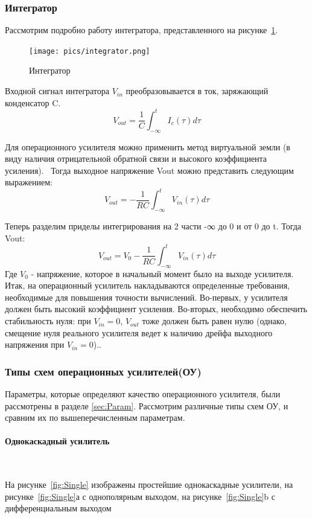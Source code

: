 \documentclass[a4paper,12pt,oneside]{scrartcl}
\begin{document}
\subsubsection{Интегратор}

Рассмотрим подробно работу интегратора, представленного на рисунке~\ref{fig:Integrator}.
\begin{figure}[!htb]
\centering
\texttt{[image: pics/integrator.png]}
\caption{Интегратор}
\label{fig:Integrator}
\end{figure}

Входной сигнал интегратора $V_{in}$ преобразовывается в ток, заряжающий конденсатор C.
$$V_{out} = \frac{1}{C}\int_{-\infty}^{t} I_{c}(\tau) d\tau$$

Для операционного усилителя можно применить метод виртуальной земли (в виду наличия отрицательной обратной связи и высокого коэффициента усиления).~\cite{B15} Тогда выходное напряжение Vout можно представить следующим выражением:
$$V_{out} = -\frac{1}{RC}\int_{-\infty}^{t} V_{in}(\tau) d\tau$$

Теперь разделим приделы интегрирования на 2 части -∞ до 0 и от 0 до t. Тогда Vout:
$$V_{out} = V_{0}-\frac{1}{RC}\int_{-\infty}^{t} V_{in}(\tau) d\tau$$
Где $V_{0}$ - напряжение, которое в начальный момент было на выходе усилителя.
Итак, на операционный усилитель накладываются определенные требования, необходимые для повышения точности вычислений. Во-первых, у усилителя должен быть высокий коэффициент усиления. Во-вторых, необходимо обеспечить стабильность нуля: при $V_{in} = 0$, $V_{out}$ тоже должен быть равен нулю (однако, смещение нуля реального усилителя ведет к наличию дрейфа выходного напряжения при $V_{in} = 0$)..~\cite{B9}

\subsubsection{Типы схем операционных усилителей(ОУ)}

Параметры, которые определяют качество операционного усилителя, были рассмотрены в разделе \ref{sec:Param}. Рассмотрим различные типы схем ОУ, и сравним их по вышеперечисленным параметрам. 




\paragraph{Однокаскадный усилитель}~~~~~~~~~~~~~~~~~~~~~~~~~~~~~

На рисунке~\ref{fig:Single} изображены простейшие однокаскадные усилители, на рисунке~\ref{fig:Single}а с однополярным выходом, на рисунке~\ref{fig:Single}b с дифференциальным выходом
\end{document}
